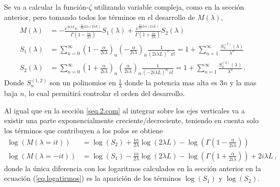 Se va a calcular la función-$\zeta$ utilizando variable compleja, como en la sección anterior, pero tomando todos los términos en el desarrollo de $M ( \lambda )$,
\begin{align}
\label{larga}
M( \lambda ) &= 
-
 \frac{e ^{2 i \lambda L } e ^{ - \frac{i \alpha  }{2 \lambda } Ln \left( 2 \lambda L \right) }  }
      { \Gamma \left( 1 - \frac{i \alpha}{2  \lambda}  \right) } S _1 ( \lambda ) +
 \frac{ e ^{   \frac{i \alpha  } {2 \lambda } Ln \left(2 \lambda L \right) } }
      { \Gamma \left( 1 + \frac{i \alpha}{2  \lambda}  \right)   } S _2 ( \lambda )        
\\[10pt]      
	S _1 ( \lambda ) &= \sum _{n=0} ^{ \infty }
\left(1 - \frac{ \alpha}{2 i \lambda}  \right) _n
\left(- \frac{ \alpha}{2 i \lambda}  \right) _n
\frac{1}{( 2 i \lambda L ) ^n \ n!} = 
	1 + \sum _{n=1} ^{\infty} \frac{S ^{(1)} _n (\lambda)}{\lambda ^n} 
\nonumber
\\[10pt]
	S _2 (\lambda ) &= \sum _{n=0 } ^{\infty}
\left( 1 + \frac{ \alpha}{2 i \lambda }  \right) _n
\left( \frac{ \alpha }{2 i \lambda} \right) _n
\frac{1}{( - 2 i \lambda L ) ^n \ n!} = 
1 + \sum _{n=1} ^{\infty} \frac{S ^{(2)} _n (\lambda)}{\lambda ^n}
\nonumber
\, .
\end{align}
Donde $S _n ^{(1,2)}$ son un polinomios en $\frac{1}{ \lambda}$ donde la potencia mas alta es $3 n$ y la mas baja $n$, lo cual permitirá controlar el orden del desarrollo.


Al igual que en la sección \ref{seq.2.com} al integrar sobre los ejes verticales va a existir una parte exponencialmente creciente/decreciente, teniendo en cuenta solo los términos que contribuyen a los polos se obtiene
\begin{align}
	\log ( M ( \lambda = i t ) ) 
&
	=   \log (S _2) + 
	\frac{i \alpha }{2 \lambda}  \log (2 \lambda L) - 
 	\log \left( \Gamma \left( 1 - \frac{ \alpha}{2 i \lambda} \right) \right) 
\\ 
	\log ( M ( \lambda=-i t ) ) 
&
	=  \log (S _1) -  
	\frac{i \alpha }{2 \lambda}  \log ( 2 \lambda L ) - 
	\log \left( \Gamma \left( 1 + \frac{ \alpha}{2 i \lambda} \right) \right) +
	2 i \lambda L  \nonumber
	\,	,
\end{align}
donde la única diferencia con los logaritmos calculados en la sección anterior en la ecuación (\ref{eq.logatirmos}) es la aparición de los términos $\log ( S _1 )$ y $ \log ( S _2) $.

